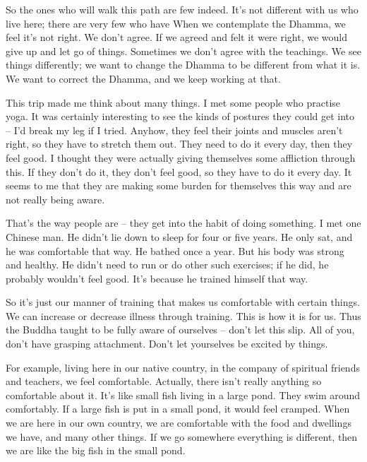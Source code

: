 So the ones who will walk this path are few indeed. It's not different with us who live here; there are very few who have  When we contemplate the Dhamma, we feel it's not right. We don't agree. If we agreed and felt it were right, we would give up and let go of things. Sometimes we don't agree with the teachings. We see things differently; we want to change the Dhamma to be different from what it is. We want to correct the Dhamma, and we keep working at that.

This trip made me think about many things. I met some people who practise yoga. It was certainly interesting to see the kinds of postures they could get into -- I'd break my leg if I tried. Anyhow, they feel their joints and muscles aren't right, so they have to stretch them out. They need to do it every day, then they feel good. I thought they were actually giving themselves some affliction through this. If they don't do it, they don't feel good, so they have to do it every day. It seems to me that they are making some burden for themselves this way and are not really being aware.

That's the way people are -- they get into the habit of doing something. I met one Chinese man. He didn't lie down to sleep for four or five years. He only sat, and he was comfortable that way. He bathed once a year. But his body was strong and healthy. He didn't need to run or do other such exercises; if he did, he probably wouldn't feel good. It's because he trained himself that way.

So it's just our manner of training that makes us comfortable with certain things. We can increase or decrease illness through training. This is how it is for us. Thus the Buddha taught to be fully aware of ourselves -- don't let this slip. All of you, don't have grasping attachment. Don't let yourselves be excited by things.

For example, living here in our native country, in the company of spiritual friends and teachers, we feel comfortable. Actually, there isn't really anything so comfortable about it. It's like small fish living in a large pond. They swim around comfortably. If a large fish is put in a small pond, it would feel cramped. When we are here in our own country, we are comfortable with the food and dwellings we have, and many other things. If we go somewhere everything is different, then we are like the big fish in the small pond.

